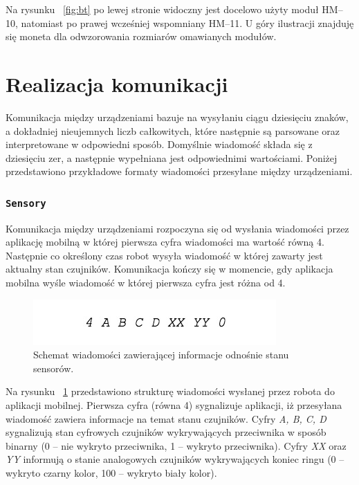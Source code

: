 Na rysunku ~\ref{fig:bt} po lewej stronie widoczny jest docelowo użyty moduł HM–10, natomiast po prawej wcześniej wspomniany HM–11. U góry ilustracji znajduję się moneta dla odwzorowania rozmiarów omawianych modułów.

\section{Realizacja komunikacji}
Komunikacja między urządzeniami bazuje na wysyłaniu ciągu dziesięciu znaków, a dokładniej nieujemnych liczb całkowitych, które następnie są parsowane oraz interpretowane w odpowiedni sposób. Domyślnie wiadomość składa się z dziesięciu zer, a następnie wypełniana jest odpowiednimi wartościami. Poniżej przedstawiono przykładowe formaty wiadomości przesyłane między urządzeniami.

 \subsubsection{\lstinline$Sensory$}
Komunikacja między urządzeniami rozpoczyna się od wysłania wiadomości przez aplikację mobilną w której pierwsza cyfra wiadomości ma wartość równą 4. Następnie co określony czas robot wysyła wiadomość w której zawarty jest aktualny stan czujników. Komunikacja kończy się w momencie, gdy aplikacja mobilna wyśle wiadomość w której pierwsza cyfra jest różna od 4.

\begin{figure}[H]
	\centering
		\includegraphics[width=0.75\linewidth]{pic03/sensors.jpg}
	\caption{Schemat wiadomości zawierającej informacje odnośnie stanu sensorów.}
	\label{fig:sensors_communication}	
\end{figure}

Na rysunku ~\ref{fig:sensors_communication} przedstawiono strukturę wiadomości wysłanej przez robota do aplikacji mobilnej. Pierwsza cyfra (równa 4) sygnalizuje aplikacji, iż przesyłana wiadomość zawiera informacje na temat stanu czujników. Cyfry \textit{A, B, C, D} sygnalizują stan cyfrowych czujników wykrywających przeciwnika w sposób binarny (0 – nie wykryto przeciwnika, 1 – wykryto przeciwnika). Cyfry \textit{XX} oraz \textit{YY} informują o stanie analogowych czujników wykrywających koniec ringu (0 – wykryto czarny kolor, 100 – wykryto biały kolor).

